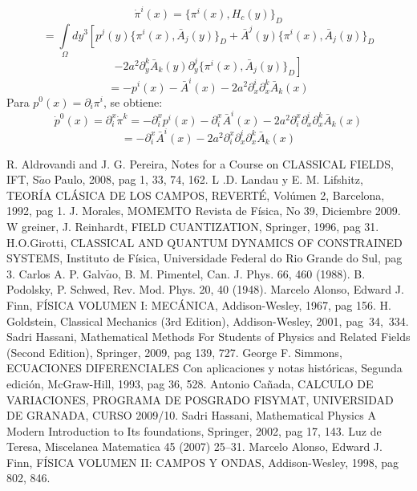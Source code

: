 \documentclass[a4paper,12pt]{article}
\begin{document}
\begin{equation}
\dot{\pi}^i(x)=\{\pi^i(x),H_c(y)\}_D 
\end{equation}
$$=\int\limits_{\Omega}dy^{3}\left[p^{j}(y)\{\pi^i(x),\bar{A}_j(y)\}_D+\bar{A}^j(y)\{\pi^i(x),\bar{A}_j(y)\}_D\right.$$
$$\left.-2a^2\partial^k_y\bar{A}_k(y)\partial^j_y\{\pi^i(x),\bar{A}_j(y)\}_D\right]$$
$$=-p^{i}(x)-\bar{A}^i(x)-2a^2\partial^i_x\partial^k_x\bar{A}_k(x)$$
Para $p^0(x)=\partial_i\pi^i$, se obtiene:
\begin{equation}
\dot{p}^0(x)=\partial_i^x\dot{\pi}^k=-\partial_i^xp^{i}(x)-\partial_i^x\bar{A}^i(x)-2a^2\partial_i^x\partial^i_x\partial^k_x\bar{A}_k(x)
\end{equation}
$$=-\partial_i^x\bar{A}^i(x)-2a^2\partial_i^x\partial^i_x\partial^k_x\bar{A}_k(x)$$
\newpage
\begin{thebibliography}{99}
 R. Aldrovandi and J. G. Pereira, Notes for a Course on CLASSICAL FIELDS, IFT, S$\widetilde{a}$o Paulo, 2008, pag 1, 33, 74, 162.
 L .D. Landau y E. M. Lifshitz, TEORÍA CLÁSICA DE LOS CAMPOS, REVERTÉ, Volúmen 2, Barcelona, 1992, pag 1. 
 J. Morales, MOMEMTO Revista de Física, No 39, Diciembre 2009. 
 W greiner, J. Reinhardt, FIELD CUANTIZATION,  Springer, 1996, pag 31. 
 H.O.Girotti, CLASSICAL AND QUANTUM DYNAMICS OF \mbox{CONSTRAINED} SYSTEMS, Instituto de Física, Universidade Federal do Rio Grande do Sul, pag 3.
 Carlos A. P. Galv$\widetilde{a}$o,  B. M. Pimentel, Can. J. Phys. 66, 460 (1988).
 B. Podolsky, P. Schwed, Rev. Mod. Phys. 20, 40 (1948).
 Marcelo Alonso, Edward J. Finn, FÍSICA VOLUMEN I: MECÁNICA, Addison-Wesley, 1967, pag 156. 
 H. Goldstein, Classical Mechanics (3rd Edition), Addison-Wesley, 2001, \mbox{pag 34, 334.}
 Sadri Hassani, Mathematical Methods For Students of Physics and Related Fields (Second Edition), Springer, 2009, pag 139, 727. 
 George F. Simmons, ECUACIONES DIFERENCIALES Con aplicaciones y notas históricas, Segunda edición, McGraw-Hill, 1993, pag 36, 528.  
 Antonio Cañada, CALCULO DE VARIACIONES, PROGRAMA DE \mbox{POSGRADO} \mbox{FISYMAT}, UNIVERSIDAD DE GRANADA, CURSO 2009/10.
 Sadri Hassani, Mathematical Physics A Modern Introduction to Its foundations, Springer,  2002, pag 17, 143.
 Luz de Teresa, Miscelanea Matematica 45 (2007) 25–31.
 Marcelo Alonso, Edward J. Finn, FÍSICA VOLUMEN II: CAMPOS Y ONDAS, Addison-Wesley, 1998, pag 802, 846.

\end{thebibliography}
\end{document}
